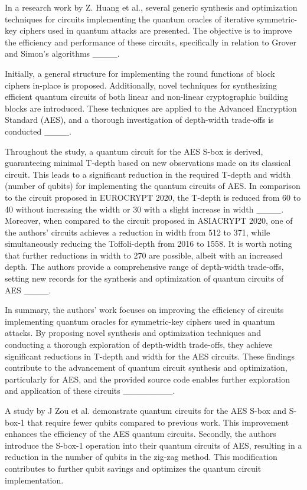 In a research work by Z. Huang et al., several generic synthesis and optimization techniques for circuits implementing the quantum oracles of iterative symmetric-key ciphers used in quantum attacks are presented. The objective is to improve the efficiency and performance of these circuits, specifically in relation to Grover and Simon's algorithms ____. 
 

Initially, a general structure for implementing the round functions of block ciphers in-place is proposed. Additionally, novel techniques for synthesizing efficient quantum circuits of both linear and non-linear cryptographic building blocks are introduced. These techniques are applied to the Advanced Encryption Standard (AES), and a thorough investigation of depth-width trade-offs is conducted ____. 
 

Throughout the study, a quantum circuit for the AES S-box is derived, guaranteeing minimal T-depth based on new observations made on its classical circuit. This leads to a significant reduction in the required T-depth and width (number of qubits) for implementing the quantum circuits of AES. In comparison to the circuit proposed in EUROCRYPT 2020, the T-depth is reduced from 60 to 40 without increasing the width or 30 with a slight increase in width ____. Moreover, when compared to the circuit proposed in ASIACRYPT 2020, one of the authors' circuits achieves a reduction in width from 512 to 371, while simultaneously reducing the Toffoli-depth from 2016 to 1558. It is worth noting that further reductions in width to 270 are possible, albeit with an increased depth. The authors provide a comprehensive range of depth-width trade-offs, setting new records for the synthesis and optimization of quantum circuits of AES ____. 
 

In summary, the authors' work focuses on improving the efficiency of circuits implementing quantum oracles for symmetric-key ciphers used in quantum attacks. By proposing novel synthesis and optimization techniques and conducting a thorough exploration of depth-width trade-offs, they achieve significant reductions in T-depth and width for the AES circuits. These findings contribute to the advancement of quantum circuit synthesis and optimization, particularly for AES, and the provided source code enables further exploration and application of these circuits ________. 
 

A study by J Zou et al. demonstrate quantum circuits for the AES S-box and S-box-1 that require fewer qubits compared to previous work. This improvement enhances the efficiency of the AES quantum circuits. Secondly, the authors introduce the S-box-1 operation into their quantum circuits of AES, resulting in a reduction in the number of qubits in the zig-zag method. This modification contributes to further qubit savings and optimizes the quantum circuit implementation. 
 

